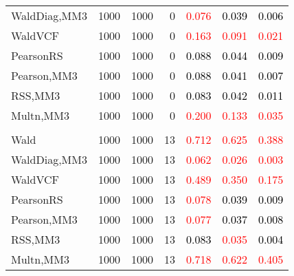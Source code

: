 \documentclass[
]{article}
\begin{document}
\begin{table}[H]
{\begin{tabular}[t]{lrrrrrr}
\hspace{1em}WaldDiag,MM3 & 1000 & 1000 & 0 & \textcolor{red}{0.076} & \textcolor{black}{0.039} & \textcolor{black}{0.006}\\
\hspace{1em}WaldVCF & 1000 & 1000 & 0 & \textcolor{red}{0.163} & \textcolor{red}{0.091} & \textcolor{red}{0.021}\\
\hspace{1em}PearsonRS & 1000 & 1000 & 0 & \textcolor{black}{0.088} & \textcolor{black}{0.044} & \textcolor{black}{0.009}\\
\hspace{1em}Pearson,MM3 & 1000 & 1000 & 0 & \textcolor{black}{0.088} & \textcolor{black}{0.041} & \textcolor{black}{0.007}\\
\hspace{1em}RSS,MM3 & 1000 & 1000 & 0 & \textcolor{black}{0.083} & \textcolor{black}{0.042} & \textcolor{black}{0.011}\\
\hspace{1em}Multn,MM3 & 1000 & 1000 & 0 & \textcolor{red}{0.200} & \textcolor{red}{0.133} & \textcolor{red}{0.035}\\
\addlinespace[0.3em]
\multicolumn{7}{l}{\textbf{1F 15V}}\\
\hspace{1em}Wald & 1000 & 1000 & 13 & \textcolor{red}{0.712} & \textcolor{red}{0.625} & \textcolor{red}{0.388}\\
\hspace{1em}WaldDiag,MM3 & 1000 & 1000 & 13 & \textcolor{red}{0.062} & \textcolor{red}{0.026} & \textcolor{red}{0.003}\\
\hspace{1em}WaldVCF & 1000 & 1000 & 13 & \textcolor{red}{0.489} & \textcolor{red}{0.350} & \textcolor{red}{0.175}\\
\hspace{1em}PearsonRS & 1000 & 1000 & 13 & \textcolor{red}{0.078} & \textcolor{black}{0.039} & \textcolor{black}{0.009}\\
\hspace{1em}Pearson,MM3 & 1000 & 1000 & 13 & \textcolor{red}{0.077} & \textcolor{black}{0.037} & \textcolor{black}{0.008}\\
\hspace{1em}RSS,MM3 & 1000 & 1000 & 13 & \textcolor{black}{0.083} & \textcolor{red}{0.035} & \textcolor{black}{0.004}\\
\hspace{1em}Multn,MM3 & 1000 & 1000 & 13 & \textcolor{red}{0.718} & \textcolor{red}{0.622} & \textcolor{red}{0.405}\\

\end{tabular}}
\end{table}
\end{document}
